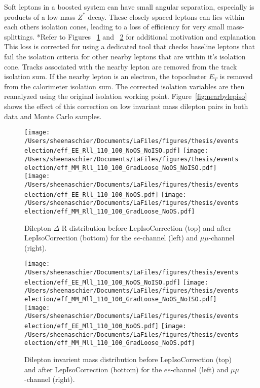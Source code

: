  Soft leptons in a boosted system can have small angular separation, especially is products of a low-mass $Z^*$ decay.  These closely-spaced leptons can lies within each others isolation cones, leading to a loss of efficiency for very small mass-splittings.  *Refer to Figures~ \ref{fig:EffRll_ISOCorr} and ~\ref{fig:EffMll_ISOCorr} for additional motivation and explanation  This loss is corrected for using a dedicated tool that checks baseline leptons that fail the isolation criteria for other nearby leptons that are within it's isolation cone.  Tracks associated with the nearby lepton are removed from the track isolation sum.  If the nearby lepton is an electron, the topocluster $E_T$ is removed from the calorimeter isolation sum.  The corrected isolation variables are then reanalyzed using the original isolation working point.  Figure~\ref{fig:nearbylepiso} shows the effect of this correction on low invariant mass dilepton pairs in both data and Monte Carlo samples.


  \begin{figure}[tbp]
     \texttt{[image: /Users/sheenaschier/Documents/LaFiles/figures/thesis/eventselection/eff\_EE\_Rll\_110\_100\_NoOS\_NoISO.pdf]}
       \texttt{[image: /Users/sheenaschier/Documents/LaFiles/figures/thesis/eventselection/eff\_MM\_Rll\_110\_100\_GradLoose\_NoOS\_NoISO.pdf]}\\
     \texttt{[image: /Users/sheenaschier/Documents/LaFiles/figures/thesis/eventselection/eff\_EE\_Rll\_110\_100\_NoOS.pdf]}
     \texttt{[image: /Users/sheenaschier/Documents/LaFiles/figures/thesis/eventselection/eff\_MM\_Rll\_110\_100\_GradLoose\_NoOS.pdf]}\\
   \caption{Dilepton $\Delta$ R distribution before LepIsoCorrection (top) and after LepIsoCorrection (bottom) for the $ee$-channel (left) and $\mu\mu$-channel (right).}
   \label{fig:EffRll_ISOCorr}
 \end{figure}

  \begin{figure}[tbp]
     \texttt{[image: /Users/sheenaschier/Documents/LaFiles/figures/thesis/eventselection/eff\_EE\_Mll\_110\_100\_NoOS\_NoISO.pdf]}
       \texttt{[image: /Users/sheenaschier/Documents/LaFiles/figures/thesis/eventselection/eff\_MM\_Mll\_110\_100\_GradLoose\_NoOS\_NoISO.pdf]}\\
     \texttt{[image: /Users/sheenaschier/Documents/LaFiles/figures/thesis/eventselection/eff\_EE\_Mll\_110\_100\_NoOS.pdf]}
     \texttt{[image: /Users/sheenaschier/Documents/LaFiles/figures/thesis/eventselection/eff\_MM\_Mll\_110\_100\_GradLoose\_NoOS.pdf]}\\
   \caption{Dilepton invarient mass distribution before LepIsoCorrection (top) and after LepIsoCorrection (bottom) for the $ee$-channel (left) and $\mu\mu$-channel (right).}
   \label{fig:EffMll_ISOCorr}
 \end{figure}

